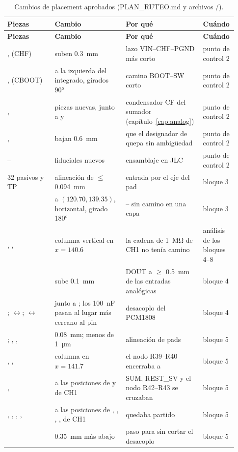{\small
\begin{longtable}{@{}L{0.2\linewidth}L{0.3\linewidth}L{0.3\linewidth}L{0.13\linewidth}@{}}
\caption{Cambios de placement aprobados (PLAN\_RUTEO.md y archivos /).}
\label{tab:c07-cambios}\\
\toprule
\textbf{Piezas} & \textbf{Cambio} & \textbf{Por qué} & \textbf{Cuándo}\\
\midrule\endfirsthead
\toprule
\textbf{Piezas} & \textbf{Cambio} & \textbf{Por qué} & \textbf{Cuándo}\\
\midrule\endhead
{},  (CHF) & suben \SI{0.3}{\milli\meter} & lazo VIN--CHF--PGND más corto & punto de control 2\\
,  (CBOOT) & a la izquierda del integrado, girados \ang{90} & camino BOOT--SW corto & punto de control 2\\
,  & piezas nuevas, junto a  y  & condensador CF del sumador (capítulo~\ref{cap:analog}) & punto de control 2\\
,  & bajan \SI{0.6}{\milli\meter} & que el designador de  quepa sin ambigüedad & punto de control 2\\
-- & fiduciales nuevos & ensamblaje en JLC & punto de control 2\\
32 pasivos y TP & alineación de $\leq$ \SI{0.094}{\milli\meter} & entrada por el eje del pad & bloque 3\\
 & a $(\num{120.70}, \num{139.35})$, horizontal, girado \ang{180} & -- sin camino en una capa & bloque 3\\
, ,  & columna vertical en $x = \num{140.6}$ & la cadena de \SI{1}{\mega\ohm} de CH1 no tenía camino & análisis de los bloques 4--8\\
 & sube \SI{0.1}{\milli\meter} & DOUT a $\geq$ \SI{0.5}{\milli\meter} de las entradas analógicas & bloque 4\\
; $\leftrightarrow$; $\leftrightarrow$ &  junto a ; los \SI{100}{\nano\farad} pasan al lugar más cercano al pin & desacoplo del PCM1808 & bloque 4\\
; , ,  & \SI{+0.08}{\milli\meter}; menos de \SI{1}{\micro\meter} & alineación de pads & bloque 5\\
, ,  & columna en $x = \num{141.7}$ & el nodo R39--R40 encerraba a  & bloque 5\\
,  & a las posiciones de  y  de CH1 & SUM, REST\_SV y el nodo R42--R43 se cruzaban & bloque 5\\
, , , ,  & a las posiciones de , , , ,  de CH1 &  quedaba partido & bloque 5\\
 & \SI{0.35}{\milli\meter} más abajo & paso para  sin cortar el desacoplo & bloque 5\\
\bottomrule
\end{longtable}
}

